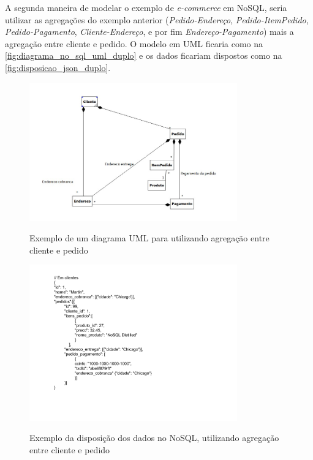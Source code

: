 A segunda maneira de modelar o exemplo de \textit{e-commerce} em NoSQL, seria utilizar as agregações do exemplo anterior (\textit{Pedido-Endereço}, \textit{Pedido-ItemPedido}, \textit{Pedido-Pagamento}, \textit{Cliente-Endereço}, e por fim \textit{Endereço-Pagamento}) mais a agregação entre cliente e pedido. O modelo em \ac{UML} ficaria como na \autoref{fig:diagrama_no_sql_uml_duplo} e os dados ficariam dispostos como na \autoref{fig:disposicao_json_duplo}.

\begin{figure}[H]
    \centering
    \caption{Exemplo de um diagrama \ac{UML} para utilizando agregação entre cliente e pedido}
    \includegraphics[width=0.8\textwidth]{./04-figuras/diagrama_no_sql_uml_duplo.jpg}
    \label{fig:diagrama_no_sql_uml_duplo}
\end{figure}
\begin{figure}[H]
    \centering
    \caption{Exemplo da disposição dos dados no NoSQL, utilizando agregação entre cliente e pedido}
    \includegraphics[width=0.8\textwidth]{./04-figuras/disposicao_json_duplo.png}
    \label{fig:disposicao_json_duplo}
\end{figure}

